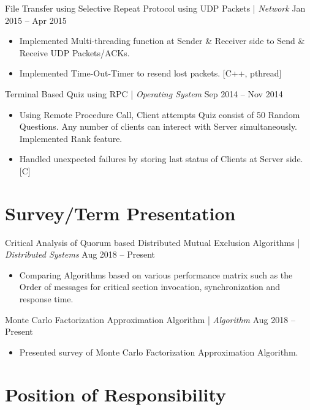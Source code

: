 \documentclass{res}
\begin{document}
\begin{resume}
{\sc File Transfer using Selective Repeat Protocol using UDP Packets} | {\it Network} \hfill Jan 2015 -- Apr 2015
\begin{itemize}
\item Implemented Multi-threading function at Sender \& Receiver side to Send \& Receive UDP Packets/ACKs.
\item Implemented Time-Out-Timer to resend lost packets. [C++, pthread]
\end{itemize}

{\sc Terminal Based Quiz using RPC} | {\it Operating System} \hfill Sep 2014 -- Nov 2014
\begin{itemize}
\item Using Remote Procedure Call, Client attempts Quiz consist of 50 Random Questions. Any number of clients can interect with Server simultaneously. Implemented Rank feature.
\item Handled unexpected failures by storing last status of Clients at Server side. [C]
\end{itemize}

\vspace{0.01in} 
\section{{\Large Survey/Term Presentation}} 
\vspace{8pt}
 
{\sc Critical Analysis of Quorum based Distributed Mutual Exclusion Algorithms} | {\it Distributed Systems} \hfill Aug 2018 -- Present
\begin{itemize}
\item Comparing Algorithms based on various performance matrix such as the Order of messages for critical section invocation, synchronization and response time.
\end{itemize}

{\sc Monte Carlo Factorization Approximation Algorithm} | {\it Algorithm} \hfill Aug 2018 -- Present
\begin{itemize}
\item Presented survey of Monte Carlo Factorization Approximation Algorithm.
\end{itemize}

\vspace{0.01in} 
\section{{\Large Position of Responsibility}} 
\vspace{8pt}


\end{resume}
\end{document}
